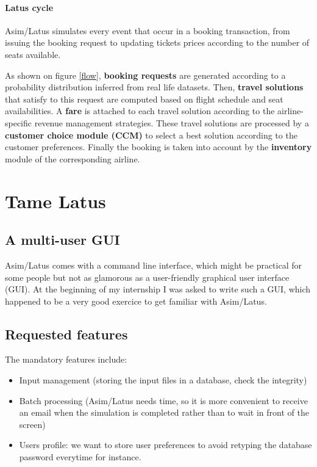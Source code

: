 \documentclass[11pt]{JHEP3}
\begin{document}

\paragraph{Latus cycle}

Asim/Latus simulates every event that occur in a booking transaction, from
issuing the booking request to updating tickets prices according to
the number of seats available.

As shown on figure \ref{flow}, \textbf{booking requests} are generated
according to a probability distribution inferred from real life
datasets. Then, \textbf{travel solutions} that satisfy to this request
are computed based on flight schedule and seat availabilities. A
\textbf{fare} is attached to each travel solution according to the
airline-specific revenue management strategies. These travel solutions
are processed by a \textbf{customer choice module (CCM)} to select a best
solution according to the customer preferences. Finally the booking
is taken into account by the \textbf{inventory} module of the
corresponding airline.


\newpage
\section{Tame Latus}

\subsection{A multi-user GUI}

Asim/Latus comes with a command line interface, which might be practical for
some people but not as glamorous as a user-friendly graphical user
interface (GUI). At the beginning of my internship I was asked to write such
a GUI, which happened to be a very good exercice to get familiar with
Asim/Latus.


\subsection{Requested features}

The mandatory features include:

\begin{itemize}
\item Input management (storing the input files in a database, check
  the integrity)
\item Batch processing (Asim/Latus needs time, so it is more
  convenient to receive an email when the simulation is completed
  rather than to wait in front of the screen)
\item Users profile: we want to store user preferences to avoid
  retyping the database password everytime for instance.
\end{itemize}
\end{document}

